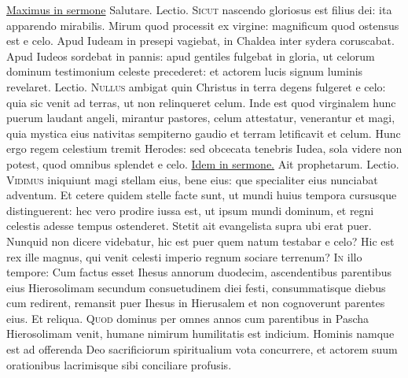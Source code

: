 \begin{multicols*}{2}
\newline \ul{Maximus in sermone} Salutare.  {\color{Red} Lectio.}
\lettrine[lines=2]{\zallmancaps \color{Red} S}{icut} nascendo gloriosus est filius dei: ita apparendo mirabilis. Mirum quod processit ex virgine: magnificum quod ostensus est e celo. Apud Iudeam in presepi vagiebat, in Chaldea inter sydera coruscabat. Apud Iudeos sordebat in pannis: apud gentiles fulgebat in gloria, ut celorum dominum testimonium celeste precederet: et actorem lucis signum luminis revelaret.
{\color{Red} Lectio.}
\lettrine[lines=2]{\zallmancaps \color{Blue} N}{ullus} ambigat quin Christus in terra degens fulgeret e celo: quia sic venit ad terras, ut non relinqueret celum. Inde est quod virginalem hunc puerum laudant angeli, mirantur pastores, celum attestatur, venerantur et magi, quia mystica eius nativitas sempiterno gaudio et terram letificavit et celum. Hunc ergo regem celestium tremit Herodes: sed obcecata tenebris Iudea, sola videre non potest, quod omnibus splendet e celo.
\newline \ul{Idem in sermone.} Ait prophetarum.  {\color{Red} Lectio.}
\lettrine[lines=2]{\zallmancaps \color{Red} V}{idimus} iniquiunt magi stellam eius, bene eius: que specialiter eius nunciabat adventum. Et cetere quidem stelle facte sunt, ut mundi huius tempora cursusque distinguerent: hec vero prodire iussa est, ut ipsum mundi dominum, et regni celestis adesse tempus ostenderet. Stetit ait evangelista supra ubi erat puer. Nunquid non dicere videbatur, hic est puer quem natum testabar e celo? Hic est rex ille magnus, qui venit celesti imperio regnum sociare terrenum?
\lettrine[lines=2]{\zallmancaps \color{Blue} I}{n} illo tempore: Cum factus esset Ihesus annorum duodecim, ascendentibus parentibus eius Hierosolimam secundum consuetudinem diei festi, consummatisque diebus cum redirent, remansit puer Ihesus in Hierusalem et non cognoverunt parentes eius. Et reliqua.
 
\lettrine[lines=2]{\zallmancaps \color{Red} Q}{uod} dominus per omnes annos cum parentibus in Pascha Hierosolimam venit, humane nimirum humilitatis est indicium. Hominis namque est ad offerenda Deo sacrificiorum spiritualium vota concurrere, et actorem suum orationibus lacrimisque sibi conciliare profusis.

\end{multicols*}
